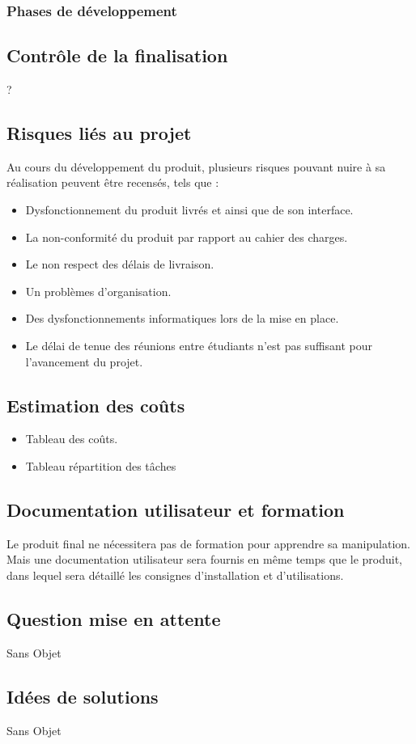 			\subsubsection{Phases de développement}
		\subsection{Contrôle de la finalisation}
			?
		\subsection{Risques liés au projet}
		Au cours du développement du produit, plusieurs risques pouvant nuire à sa réalisation peuvent être recensés, tels que :
			\begin{itemize}
			\item	Dysfonctionnement du produit livrés et ainsi que de son interface.
			\item	La non-conformité du produit par rapport au cahier des charges.
			\item	Le non respect des délais de livraison.
			\item	Un problèmes d'organisation.
			\item	Des dysfonctionnements informatiques lors de la mise en place.
			\item	Le délai de tenue des réunions entre étudiants n'est pas suffisant pour l'avancement du projet.
			\end{itemize}
			
		\subsection{Estimation des coûts}
			\begin{itemize}
			\item Tableau des coûts.
			\item Tableau répartition des tâches
			\end{itemize}
		\subsection{Documentation utilisateur et formation}
			Le produit final ne nécessitera pas de formation pour apprendre sa manipulation. Mais une documentation utilisateur 				sera fournis en même temps que le produit, dans lequel sera détaillé les consignes d'installation et d'utilisations.
			
		\subsection{Question mise en attente}
			Sans Objet
		\subsection{Idées de solutions}
			Sans Objet
		


